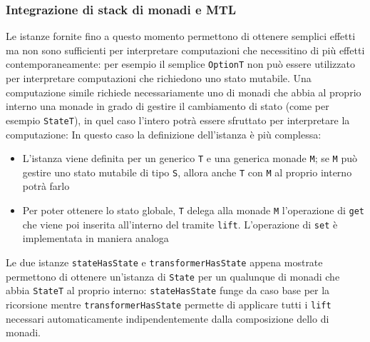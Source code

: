 \subsubsection{Integrazione di stack di monadi e MTL}
Le istanze fornite fino a questo momento permettono di ottenere semplici effetti ma non sono sufficienti per interpretare computazioni che necessitino di più effetti contemporaneamente: per esempio il semplice \lstinline{OptionT} non può essere utilizzato per interpretare computazioni che richiedono uno stato mutabile.
Una computazione simile richiede necessariamente uno  di monadi che abbia al proprio interno una monade in grado di gestire il cambiamento di stato (come per esempio \lstinline{StateT}), in quel caso l'intero  potrà essere sfruttato per interpretare la computazione:
In questo caso la definizione dell'istanza è più complessa:
\begin{itemize}
  \item L'istanza viene definita per un generico  \lstinline{T} e una generica monade \lstinline{M}; se \lstinline{M} può gestire uno stato mutabile di tipo \lstinline{S}, allora anche \lstinline{T} con \lstinline{M} al proprio interno potrà farlo
  \item Per poter ottenere lo stato globale, \lstinline{T} delega alla monade \lstinline{M} l'operazione di \lstinline{get} che viene poi inserita all'interno del  tramite \lstinline{lift}. L'operazione di \lstinline{set} è implementata in maniera analoga
\end{itemize}

Le due istanze \lstinline{stateHasState} e \lstinline{transformerHasState} appena mostrate permettono di ottenere un'istanza di \lstinline{State} per un qualunque  di monadi che abbia \lstinline{StateT} al proprio interno: \lstinline{stateHasState} funge da caso base per la ricorsione mentre \lstinline{transformerHasState} permette di applicare tutti i \lstinline{lift} necessari automaticamente indipendentemente dalla composizione dello  di monadi.

